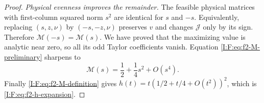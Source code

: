 \begin{proof}
\emph{Physical evenness improves the remainder.}
The feasible physical matrices with first-column squared norm $s^2$
are identical for $s$ and $-s$.  Equivalently, replacing
$(s,z,\nu)$ by $(-s,-z,\nu)$ preserves $v$ and changes
$\mathcal J$ only by its sign.  Therefore
$\mathcal M(-s)=\mathcal M(s)$.  We have proved that the maximizing
value is analytic near zero, so all its odd Taylor coefficients vanish.
Equation \eqref{I:F:eq:f2-M-preliminary} sharpens to
\begin{equation}
 \mathcal M(s)=\frac12+\frac14s^2+O(s^4).
 \label{I:F:eq:f2-M-even}
\end{equation}
Finally \eqref{I:F:eq:f2-M-definition} gives
$h(t)=t(1/2+t/4+O(t^2))^2$, which is
\eqref{I:F:eq:f2-h-expansion}.
\end{proof}
